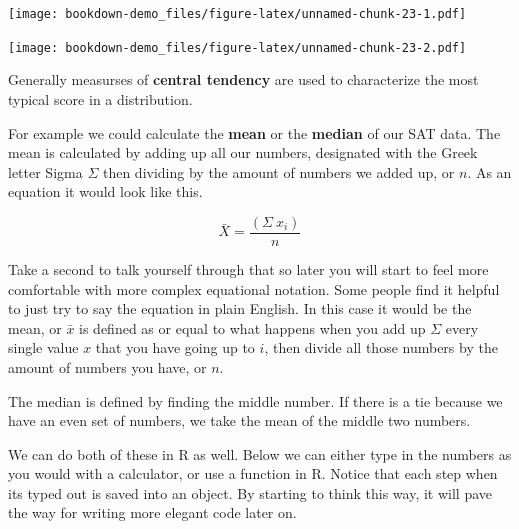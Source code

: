 \documentclass[]{book}
\newenvironment{Shaded}{\begin{snugshade}}{\end{snugshade}}
\newcommand{\KeywordTok}[1]{\textcolor[rgb]{0.13,0.29,0.53}{\textbf{#1}}}
\newcommand{\DataTypeTok}[1]{\textcolor[rgb]{0.13,0.29,0.53}{#1}}
\newcommand{\DecValTok}[1]{\textcolor[rgb]{0.00,0.00,0.81}{#1}}
\newcommand{\StringTok}[1]{\textcolor[rgb]{0.31,0.60,0.02}{#1}}
\newcommand{\OperatorTok}[1]{\textcolor[rgb]{0.81,0.36,0.00}{\textbf{#1}}}
\newcommand{\NormalTok}[1]{#1}
\theoremstyle{definition}
\theoremstyle{definition}
\theoremstyle{definition}
\theoremstyle{remark}
\begin{document}
\texttt{[image: bookdown-demo\_files/figure-latex/unnamed-chunk-23-1.pdf]}

\begin{Shaded}
\end{Shaded}

\texttt{[image: bookdown-demo\_files/figure-latex/unnamed-chunk-23-2.pdf]}

Generally measurses of \textbf{central tendency} are used to
characterize the most typical score in a distribution.

For example we could calculate the \textbf{mean} or the \textbf{median}
of our SAT data. The mean is calculated by adding up all our numbers,
designated with the Greek letter Sigma \(\Sigma\) then dividing by the
amount of numbers we added up, or \(n\). As an equation it would look
like this.

\[\bar{X} = \frac{(\Sigma\ x_i)}{n}\]

Take a second to talk yourself through that so later you will start to
feel more comfortable with more complex equational notation. Some people
find it helpful to just try to say the equation in plain English. In
this case it would be the mean, or \(\bar{x}\) is defined as or equal to
what happens when you add up \(\Sigma\) every single value \(x\) that
you have going up to \(i\), then divide all those numbers by the amount
of numbers you have, or \(n\).

The median is defined by finding the middle number. If there is a tie
because we have an even set of numbers, we take the mean of the middle
two numbers.

We can do both of these in R as well. Below we can either type in the
numbers as you would with a calculator, or use a function in R. Notice
that each step when its typed out is saved into an object. By starting
to think this way, it will pave the way for writing more elegant code
later on.
\end{document}

